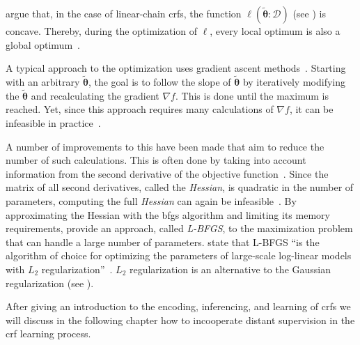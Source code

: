 \citep{sutton2010introduction} argue that, in the case of \glspl{linear-chain crf}, the function $\ell(\mathbf{\tilde{\theta}}:\mathcal{D})$ (see ) is concave.
Thereby, during the optimization of $\ell$, every local optimum is also a global optimum~\citep{sutton2010introduction}.

\bigskip

A typical approach to the optimization uses gradient ascent methods~\citep{koller2009probabilistic}.
Starting with an arbitrary $\mathbf{\tilde{\theta}}$, the goal is to follow the slope of $\mathbf{\tilde{\theta}}$ by iteratively modifying the $\mathbf{\tilde{\theta}}$ and recalculating the gradient $\nabla f$.
This is done until the maximum is reached.
Yet, since this approach requires many calculations of $\nabla f$, it can be infeasible in practice~\citep{sutton2010introduction}.

A number of improvements to this have been made that aim to reduce the number of such calculations.
This is often done by taking into account information from the second derivative of the objective function~\citep{sutton2010introduction}.
Since the matrix of all second derivatives, called the \textit{Hessian}, is quadratic in the number of parameters, computing the full \textit{Hessian} can again be infeasible~\citep{sutton2010introduction}.
By approximating the Hessian with the \gls{bfgs} algorithm and limiting its memory requirements, \citet{byrd1994representations} provide an approach, called \textit{L-BFGS}, to the maximization problem that can handle a large number of parameters.
\citet{andrew2007scalable} state that L-BFGS ``is the algorithm of choice for optimizing the parameters of large-scale log-linear models with $L_2$ regularization''~\citep{andrew2007scalable}.
$L_2$ regularization is an alternative to the Gaussian regularization (see ).

\bigskip

After giving an introduction to the encoding, inferencing, and learning of \glspl{crf} we will discuss in the following chapter how to incooperate \gls{distant supervision} in the \gls{crf} learning process.
